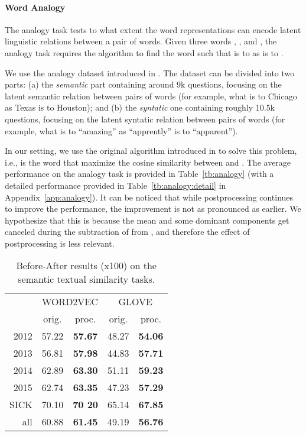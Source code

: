 \documentclass{article} \usepackage{acl2017,times}
\begin{document}
\paragraph{Word Analogy}

The analogy task  tests to what extent the word representations can encode  latent linguistic relations between a pair of words. Given three words , , and , the analogy task requires the algorithm to find the word  such that  is to  as  is to . 

We use the analogy dataset introduced in \citep{mikolov2013efficient}. The dataset can be divided into two parts: (a) the {\em semantic} part containing around 9k questions, focusing on  the latent semantic relation between pairs of words (for example, what is to {\rm Chicago} as {\rm Texas} is to {\rm Houston}); and (b) the {\em syntatic}  one containing roughly 10.5k questions, focusing on the latent syntatic relation between pairs of words (for example, what is to ``amazing'' as ``apprently'' is to ``apparent''). 

In our setting, we use the original algorithm introduced in \citep{mikolov2013efficient} to solve this problem, i.e.,  is the word that maximize the cosine similarity between  and . 
The average performance on the analogy task is provided in Table~\ref{tb:analogy} (with a detailed performance provided in Table~\ref{tb:analogy:detail} in Appendix~\ref{app:analogy}). It can be noticed that while postprocessing continues to improve the performance, the improvement is not as pronounced as earlier. We hypothesize that this is because the mean and some dominant components get canceled  during  the subtraction of  from , and therefore the effect of postprocessing is less relevant.



\begin{wraptable}{l}{0.45\textwidth}
\vspace{-10pt}
\begin{tabular}{|r||c|c||c|c|}
\hline
\multirow{2}{*}{} & \multicolumn{2}{c||}{WORD2VEC} & \multicolumn{2}{c|}{GLOVE} \\ \cline{2-5} 
                  & orig.      & proc.     & orig.    & proc.    \\ \hline
2012 &     57.22 &      \bf 57.67 &  48.27   &  \bf 54.06    \\ \hline
2013 &     56.81 &      \bf 57.98 &  44.83   & \bf 57.71     \\ \hline
2014 &     62.89 &      \bf 63.30 &   51.11  &  \bf 59.23    \\ \hline
2015 &     62.74 &      \bf 63.35&   47.23   &  \bf 57.29     \\ \hline
SICK &     70.10 &      \bf 70
20 &  65.14   &  \bf 67.85    \\ \hline
all  &     60.88 &      \bf 61.45 &  49.19   &    \bf 56.76  \\ \hline
\end{tabular}
\caption{Before-After results (x100) on the semantic textual similarity tasks.}
\label{tb:sts}
\end{wraptable}
\end{document}
